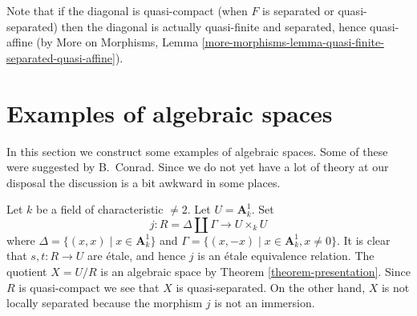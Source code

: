 \noindent
Note that if the diagonal is quasi-compact (when $F$ is separated or
quasi-separated) then the diagonal is actually
quasi-finite and separated, hence quasi-affine (by More on Morphisms,
Lemma \ref{more-morphisms-lemma-quasi-finite-separated-quasi-affine}).








\section{Examples of algebraic spaces}
\label{section-examples}

\noindent
In this section we construct some examples of algebraic spaces.
Some of these were suggested by B.\ Conrad.
Since we do not yet have a lot of theory at our disposal the
discussion is a bit awkward in some places.

\begin{example}
\label{example-affine-line-involution}
Let $k$ be a field of characteristic $\not = 2$. Let $U = \mathbf{A}^1_k$. Set
$$
j : R = \Delta \amalg \Gamma \longrightarrow U \times_k U
$$
where $\Delta = \{(x, x) \mid x \in \mathbf{A}^1_k\}$ and
$\Gamma = \{(x, -x) \mid x \in \mathbf{A}^1_k, x \not = 0\}$.
It is clear that $s, t : R \to U$ are \'etale, and hence
$j$ is an \'etale equivalence relation.
The quotient $X = U/R$ is an algebraic space by
Theorem \ref{theorem-presentation}.
Since $R$ is quasi-compact we see that $X$ is quasi-separated.
On the other hand, $X$ is not locally separated because
the morphism $j$ is not an immersion.
\end{example}

